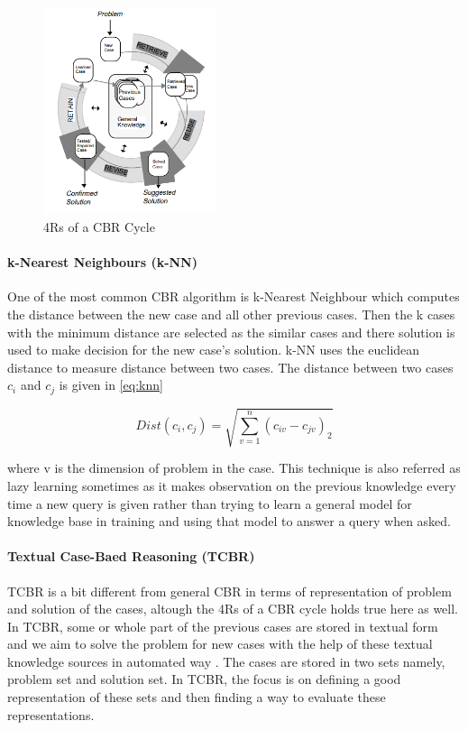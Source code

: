 \begin{figure}
    \centering
    \includegraphics[width=0.45\textwidth]{images/cbr_4r.png}
    \caption{4Rs of a CBR Cycle \cite{aamodt1994case}}
    \label{fig:cbr_4r}
\end{figure}

\paragraph{k-Nearest Neighbours (k-NN)} One of the most common CBR algorithm is k-Nearest Neighbour which computes the distance between the new case and all other previous cases. Then the k cases with the minimum distance are selected as the similar cases and there solution is used to make decision for the new case's solution. k-NN uses the euclidean distance to measure distance between two cases. The distance between two cases $c_{i}$ and $c_{j}$ is given in \cref{eq:knn}

\begin{equation}
    \label{eq:knn}
        Dist(c_{i}, c_{j}) = \sqrt{\sum_{v=1}^{n} (c_{iv}-c_{jv})_{2}}
\end{equation}

where v is the dimension of problem in the case. This technique is also referred as lazy learning sometimes as it makes observation on the previous knowledge every time a new query is given rather than trying to learn a general model for knowledge base in training and using that model to answer a query when asked.

\paragraph{Textual Case-Baed Reasoning (TCBR)}
TCBR is a bit different from general CBR in terms of representation of problem and solution of the cases, altough the 4Rs of a CBR cycle holds true here as well. In TCBR, some or whole part of the previous cases are stored in textual form and we aim to solve the problem for new cases with the help of these textual knowledge sources in automated way \cite{weber2005textual}. The cases are stored in two sets namely, problem set and solution set. In TCBR, the focus is on defining a good representation of these sets and then finding a way to evaluate these representations.

